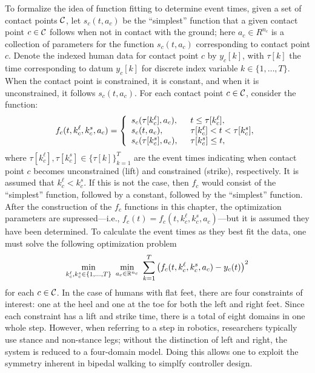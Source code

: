 To formalize the idea of function fitting to determine event times, given a set
of contact points $\mathcal{C}$, let $s_{c}(t, a_{c})$ be the ``simplest'' function that
a given contact point $c \in \mathcal{C}$ follows when not in contact with the ground;
%
here $a_{c} \in R^{n_{c}}$ is a collection of parameters for the function
$s_{c}(t, a_{c})$ corresponding to contact point $c$.
%
Denote the indexed human data for contact point $c$ by $y_{c}[k]$, with
$\tau[k]$ the time corresponding to datum $y_{c}[k]$ for discrete index variable
$k \in \{1,\ldots,T\}$.
%
When the contact point is constrained, it is constant, and when it is
unconstrained, it follows $s_{c}(t, a_{c})$.
%
For each contact point $c \in \mathcal{C}$, consider the function:
%
\begin{align*}
  f_{c}(t, k_{c}^{\ell}, k_{c}^{s}, a_{c}) =  \left\{\begin{array}{l l}
      s_{c}(\tau[k_{c}^{\ell}], a_{c}), & \hspace{2mm} t \leq  \tau[k_{c}^{\ell}],\\
      s_{c}(t, a_{c}), & \hspace{2mm} \tau[k_{c}^{\ell}] < t < \tau[k_{c}^{s}],\\
      s_{c}(\tau[k_{c}^{s}], a_{c}), & \hspace{2mm} \tau[k_{c}^{s}] \leq t,\\
  \end{array} \right.
\end{align*}
where $\tau[k_{c}^{\ell}], \tau[k_{c}^{s}] \in \{\tau[k]\}_{k = 1}^{T}$ are the
event times indicating when contact point $c$ becomes unconstrained (lift) and
constrained (strike), respectively.
%
It is assumed that $k_{c}^{\ell} < k_{c}^{s}$.
%
If this is not the case, then $f_{c}$ would consist of the ``simplest''
function, followed by a constant, followed by the ``simplest'' function.
%
After the construction of the $f_{c}$ functions in this chapter, the optimization
parameters are supressed---i.e., $f_{c}(t) = f_{c}(t, k_{c}^{\ell}, k_{c}^{s},
a_{c})$---but it is assumed they have been determined.
%
To calculate the event times as they best fit the data, one must solve the following optimization problem
\begin{align*}
  \min_{k_{c}^{\ell}, k_{c}^{s} \in \{1, \ldots, T\}} \ \min_{a_{c} \in
    \mathbb{R}^{n_{c}}} \ \sum_{k = 1}^{T} \left( f_{c}(t,k_{c}^{\ell},k_{c}^{s},a_{c})
    - y_{c}(t) \right)^2
\end{align*}
for each $c \in \mathcal{C}$.
%
In the case of humans with flat feet, there are four constraints of interest:
%
one at the heel and one at the toe for both the left and right feet.
%
Since each constraint has a lift and strike time, there is a total of eight
domains in one whole step.
%
However, when referring to a step in robotics, researchers typically use stance
and non-stance legs;
%
without the distinction of left and right, the system is reduced to a
four-domain model.
%
Doing this allows one to exploit the symmetry inherent in bipedal walking to
simplfy controller design.

